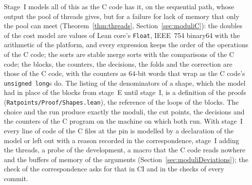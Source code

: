 Stage~I models all of this as the C code has it, on the sequential path, whose output the pool of
threads gives, but for a failure for lack of memory that only the pool can meet
(Theorem~\ref{thm:threads}, Section~\ref{sec:moduliC}): the doubles of the cost model are values of
Lean core's \verb|Float|, IEEE~754 binary64 with the arithmetic of the platform, and every
expression keeps the order of the operations of the C code; the sorts are stable merge sorts with
the comparisons of the C code; the blocks, the counters, the decisions, the folds and the correction
are those of the C code, with the counters as $64$-bit words that wrap as the C code's
\verb|unsigned long|s do. The listing of the denominators of a shape, which the model had in place
of the blocks from stage~E until stage~I, is a definition of the proofs
(\verb|Ratpoints/Proof/Shapes.lean|), the reference of the loops of the blocks. The choice and the
run produce exactly the moduli, the cut points, the decisions and the counters of the C program on
the machine on which both run. With stage~I every line of code of the C files at the pin is modelled
by a declaration of the model or left out with a reason recorded in the correspondence, stage~I
adding the threads, a probe of the development, a macro that the C code reads nowhere and the
buffers of memory of the arguments (Section~\ref{sec:moduliDeviations}); the check of the
correspondence asks for that in CI and in the checks of every commit.

